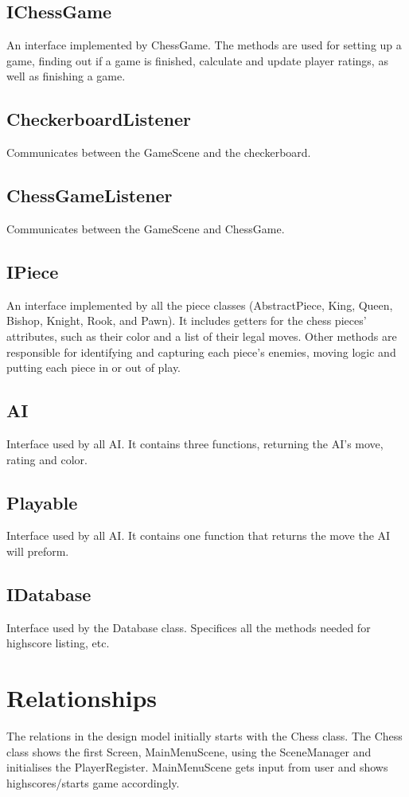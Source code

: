 \documentclass{article}
\begin{document}
\subsection {IChessGame}
An interface implemented by ChessGame. The methods are used for setting up a game, finding out if a game is finished, calculate and update player ratings, as well as finishing a game. 

\subsection {CheckerboardListener}
Communicates between the GameScene and the checkerboard. 

\subsection {ChessGameListener}
Communicates between the GameScene and ChessGame.

\subsection {IPiece}
An interface implemented by all the piece classes (AbstractPiece, King, Queen, Bishop, Knight, Rook, and Pawn). It includes getters for the chess pieces’ attributes, such as their color and a list of their legal moves. Other methods are responsible for identifying and capturing each piece’s enemies, moving logic and putting each piece in or out of play.

\subsection {AI}
Interface used by all AI. It contains three functions, returning  the AI’s move, rating and color.

\subsection {Playable}
Interface used by all AI. It  contains one function that returns the move the AI will preform.

\subsection {IDatabase}
Interface used by the Database class. Specifices all the methods needed for highscore listing, etc.

\section*{Relationships}
The relations in the design model initially starts with the Chess class. The Chess class shows the first Screen, MainMenuScene, using the SceneManager and initialises the PlayerRegister. MainMenuScene gets input from user and shows highscores/starts game accordingly.
\end{document}
